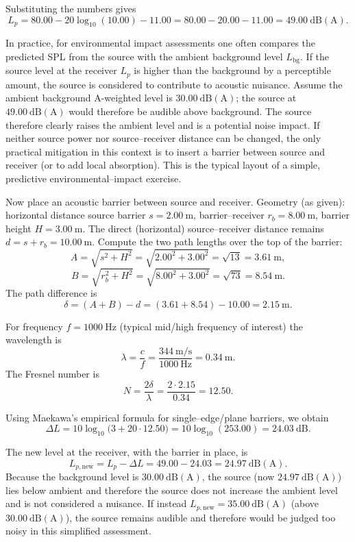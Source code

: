 Substituting the numbers gives
\[
L_{p}=80.00-20\log_{10}(10.00)-11.00=80.00-20.00-11.00=\mathbf{49.00\ \mathrm{dB(A)}}.
\]

In practice, for environmental impact assessments one often compares the predicted SPL from the source with the ambient background level \(L_{\mathrm{bg}}\). If the source level at the receiver \(L_p\) is higher than the background by a perceptible amount, the source is considered to contribute to acoustic nuisance. Assume the ambient background A-weighted level is \(30.00\ \mathrm{dB(A)}\); the source at \(49.00\ \mathrm{dB(A)}\) would therefore be audible above background. The source therefore clearly raises the ambient level and is a potential noise impact. If neither source power nor source–receiver distance can be changed, the only practical mitigation in this context is to insert a barrier between source and receiver (or to add local absorption). This is the typical layout of a simple, predictive environmental–impact exercise.

Now place an acoustic barrier between source and receiver. Geometry (as given): horizontal distance source barrier \(s=2.00\ \mathrm{m}\), barrier–receiver \(r_b=8.00\ \mathrm{m}\), barrier height \(H=3.00\ \mathrm{m}\). The direct (horizontal) source–receiver distance remains \(d=s+r_b=10.00\ \mathrm{m}\). Compute the two path lengths over the top of the barrier:
\[
A=\sqrt{s^{2}+H^{2}}=\sqrt{2.00^{2}+3.00^{2}}=\sqrt{13}=3.61\ \mathrm{m},
\]
\[
B=\sqrt{r_b^{2}+H^{2}}=\sqrt{8.00^{2}+3.00^{2}}=\sqrt{73}=8.54\ \mathrm{m}.
\]
The path difference is
\[
\delta=(A+B)-d=(3.61+8.54)-10.00=2.15\ \mathrm{m}.
\]

For frequency \(f=1000\ \mathrm{Hz}\) (typical mid/high frequency of interest) the wavelength is
\[
\lambda=\frac{c}{f}=\frac{344\ \mathrm{m/s}}{1000\ \mathrm{Hz}}=0.34\ \mathrm{m}.
\]
The Fresnel number is
\[
N=\frac{2\delta}{\lambda}=\frac{2\cdot 2.15}{0.34}=12.50.
\]

Using Maekawa's empirical formula for single–edge/plane barriers, we obtain
\[
\Delta L=10\log_{10}\bigl(3+20\cdot 12.50\bigr)
=10\log_{10}(253.00)=\mathbf{24.03\ \mathrm{dB}}.
\]

The new level at the receiver, with the barrier in place, is
\[
L_{p,\mathrm{new}}=L_{p}-\Delta L=49.00-24.03=\mathbf{24.97\ \mathrm{dB(A)}}.
\]
Because the background level is \(30.00\ \mathrm{dB(A)}\), the source (now \(24.97\ \mathrm{dB(A)}\)) lies below ambient and therefore the source does not increase the ambient level and is not considered a nuisance. If instead \(L_{p,\mathrm{new}}=35.00\ \mathrm{dB(A)}\) (above \(30.00\ \mathrm{dB(A)}\)), the source remains audible and therefore would be judged too noisy in this simplified assessment.

